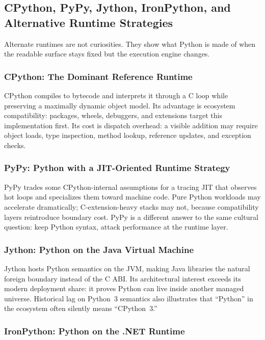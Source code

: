 \subsection{CPython, PyPy, Jython, IronPython, and Alternative Runtime Strategies}

Alternate runtimes are not curiosities. They show what Python is made of when the readable surface stays fixed but the execution engine changes.

\subsubsection{CPython: The Dominant Reference Runtime}

CPython compiles to bytecode and interprets it through a C loop while preserving a maximally dynamic object model. Its advantage is ecosystem compatibility: packages, wheels, debuggers, and extensions target this implementation first. Its cost is dispatch overhead: a visible addition may require object loads, type inspection, method lookup, reference updates, and exception checks.

\subsubsection{PyPy: Python with a JIT-Oriented Runtime Strategy}

PyPy trades some CPython-internal assumptions for a tracing JIT that observes hot loops and specializes them toward machine code. Pure Python workloads may accelerate dramatically; C-extension-heavy stacks may not, because compatibility layers reintroduce boundary cost. PyPy is a different answer to the same cultural question: keep Python syntax, attack performance at the runtime layer.

\subsubsection{Jython: Python on the Java Virtual Machine}

Jython hosts Python semantics on the JVM, making Java libraries the natural foreign boundary instead of the C ABI. Its architectural interest exceeds its modern deployment share: it proves Python can live inside another managed universe. Historical lag on Python~3 semantics also illustrates that ``Python'' in the ecosystem often silently means ``CPython~3.''

\subsubsection{IronPython: Python on the .NET Runtime}

